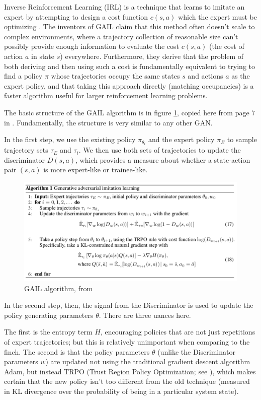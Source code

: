 \documentclass[aps,prl,preprint,groupedaddress]{revtex4-1}
\begin{document}
Inverse Reinforcement Learning (IRL) is a technique that learns to imitate an expert by attempting to design a cost function 
$c(s, a)$ which the expert must be optimizing \cite{gail}.
The inventors of GAIL claim that this method often doesn't scale to complex environments, 
where a trajectory collection of reasonable size can't possibly provide enough information 
to evaluate the cost $c(s, a)$ (the cost of action $a$ in state $s$) everywhere. 
Furthermore, they derive that the problem of both deriving and then using such a cost 
is fundamentally equivalent to trying to find a policy $\pi$ whose 
trajectories occupy the same states $s$ and actions $a$ as the expert policy, 
and that taking this approach directly (matching occupancies) 
is a faster algorithm useful for larger reinforcement learning problems.

The basic structure of the GAIL algorithm is in figure \ref{GAILalgo}, copied here from page $7$ in \cite{gail}. 
Fundamentally, the structure is very similar to any other GAN.

In the first step, we use the existing policy $\pi_{\theta_i}$ 
and the expert policy $\pi_E$ to sample trajectory sets $\tau_E$ and $\tau_i$. 
We then use both sets of trajectories to update 
the discriminator $D(s, a)$, which provides a measure about whether a state-action pair $(s, a)$ is more 
expert-like or trainee-like. 

\begin{figure}[h]
   \centering
   \includegraphics[width=1.0\textwidth]{jqfigs/GAILalgo.pdf}
   \caption{\label{GAILalgo} GAIL algorithm, from \cite{gail}}
\end{figure}

In the second step, then, the signal from the Discriminator is used to update the policy generating parameters
$\theta$. There are three uances here. 

The first is the entropy term $H$, encouraging policies that are not just repetitions of expert trajectories; 
but this is relatively unimportant when comparing to the finch.
The second is that the policy parameters $\theta$ 
(unlike the Discriminator parameters $w$) 
are updated not using the traditional gradient descent algorithm Adam, but instead TRPO 
(Trust Region Policy Optimization; see \cite{trpo}),
which makes certain that the new policy isn't too different from the old technique 
(measured in KL divergence over the probability of being in a particular system state).
\end{document}

